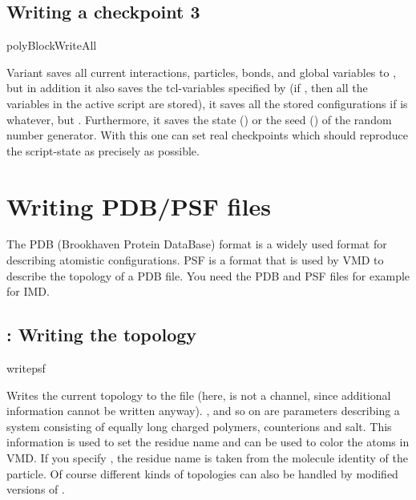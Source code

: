 \subsection{Writing a checkpoint 3}
\begin{essyntax}
   polyBlockWriteAll  
  
\end{essyntax}

Variant  saves all current interactions, particles, bonds,
and global variables to , but in addition it also
saves the tcl-variables specified by  (if , then
all the variables in the active script are stored), it saves all the
stored configurations if  is whatever, but \lit{-}.
Furthermore, it saves the state () or the seed ()
of the random number generator.  With this one can set real
checkpoints which should reproduce the script-state as precisely as
possible.

\section{Writing PDB/PSF files}
The PDB (Brookhaven Protein DataBase) format is a widely used format
for describing atomistic configurations. PSF is a format that is used
by VMD to describe the topology of a PDB file. You need the PDB and
PSF files for example for IMD.

\subsection{: Writing the topology}

\begin{essyntax}
  writepsf     
   
\end{essyntax}
Writes the current topology to the file  (here, 
is not a channel, since additional information cannot be written
anyway).  ,  and so on are parameters describing a
system consisting of equally long charged polymers, counterions and
salt.  This information is used to set the residue name and can be
used to color the atoms in VMD. If you specify , the
residue name is taken from the molecule identity of the particle. Of
course different kinds of topologies can also be handled by modified
versions of .


